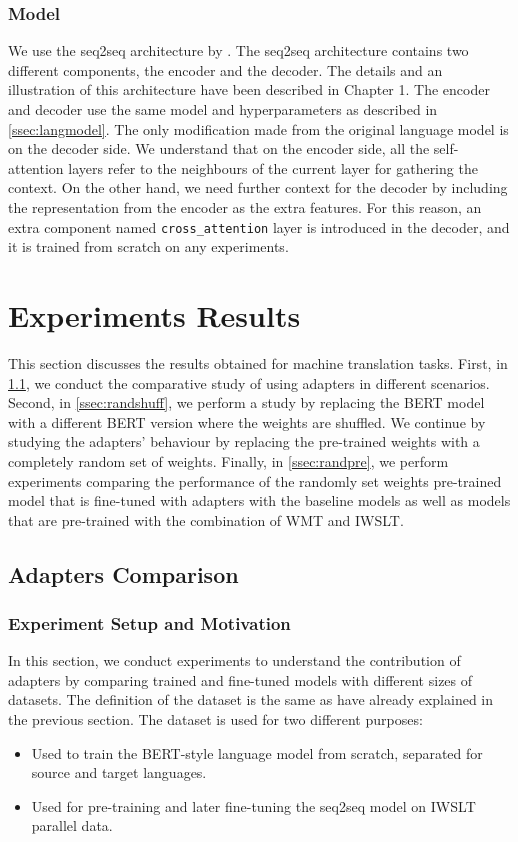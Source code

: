 \subsubsection{Model}
We use the seq2seq architecture by \cite{vaswani2017attention}. The seq2seq architecture contains two different components, the encoder and the decoder. The details and an illustration of this architecture have been described in Chapter 1. The encoder and decoder use the same model and hyperparameters as described in \cref{ssec:langmodel}. The only modification made from the original language model is on the decoder side. We understand that on the encoder side, all the self-attention layers refer to the neighbours of the current layer for gathering the context. On the other hand, we need further context for the decoder by including the representation from the encoder as the extra features. For this reason, an extra component named \texttt{cross\_attention} layer is introduced in the decoder, and it is trained from scratch on any experiments.

\section{Experiments Results}
This section discusses the results obtained for machine translation tasks. First, in \cref{ssec:adaptcomp}, we conduct the comparative study of using adapters in different scenarios. Second, in \cref{ssec:randshuff}, we perform a study by replacing the BERT model with a different BERT version where the weights are shuffled. We continue by studying the adapters' behaviour by replacing the pre-trained weights with a completely random set of weights. Finally, in \cref{ssec:randpre}, we perform experiments comparing the performance of the randomly set weights pre-trained model that is fine-tuned with adapters with the baseline models as well as models that are pre-trained with the combination of WMT and IWSLT.

\subsection{Adapters Comparison}
\label{ssec:adaptcomp}
\subsubsection{Experiment Setup and Motivation}
In this section, we conduct experiments to understand the contribution of adapt\-ers by comparing trained and fine-tuned models with different sizes of datasets. The definition of the dataset is the same as have already explained in the previous section. The dataset is used for two different purposes:
\begin{itemize}
    \item Used to train the BERT-style language model from scratch, separated for source and target languages.
    \item Used for pre-training and later fine-tuning the seq2seq model on IWSLT parallel data.
\end{itemize}

